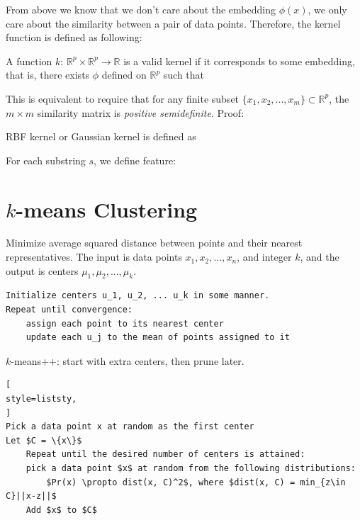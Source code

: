  From above we know that we don't care about the embedding $\phi(x)$, we only 
care about the similarity between a pair of data points. Therefore, the kernel function is defined as following:
\vspace{0.5cm}
\begin{definition}
    A function $k$: $\mathbb{R}^p \times \mathbb{R}^p \rightarrow \mathbb{R}$ is a valid kernel if it corresponds to some embedding, that is, there exists $\phi$ defined on $\mathbb{R}^p$ such that
\end{definition}

This is equivalent to require that for any finite subset $\{x_1, x_2, ..., x_m\} \subset \mathbb{R}^p$,
the $m \times m$ similarity matrix 
is \textit{positive semidefinite}. Proof:

RBF kernel or Gaussian kernel is defined as

For each substring $s$, we define feature:


\section{$k$-means Clustering}
 Minimize average squared distance between points and their nearest representatives.
The input is data points $x_1, x_2, ..., x_n$, and integer $k$, and the output is centers
$\mu_1, \mu_2, ..., \mu_k$.

\begin{verbatim}
Initialize centers u_1, u_2, ... u_k in some manner.
Repeat until convergence:
    assign each point to its nearest center
    update each u_j to the mean of points assigned to it
\end{verbatim}

 $k$-means++: start with extra centers, then prune later.

\begin{lstlisting}[
style=liststy,
]
Pick a data point x at random as the first center
Let $C = \{x\}$
	Repeat until the desired number of centers is attained:
	pick a data point $x$ at random from the following distributions: 
		$Pr(x) \propto dist(x, C)^2$, where $dist(x, C) = min_{z\in C}||x-z||$
	Add $x$ to $C$
\end{lstlisting}

